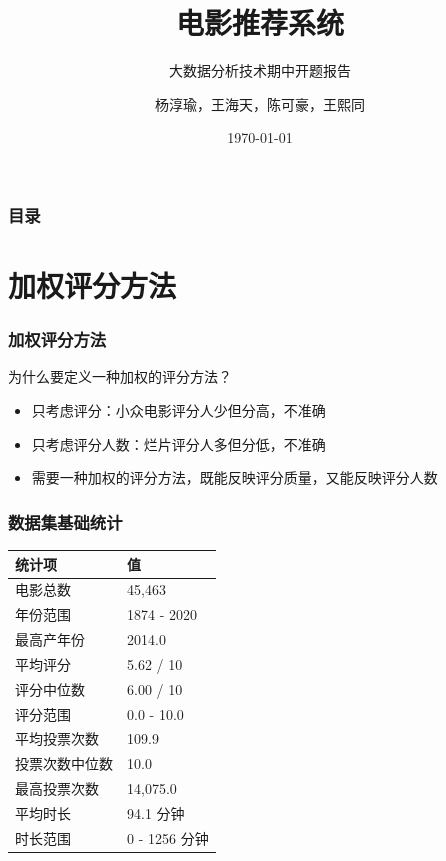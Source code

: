 \documentclass{beamer}
\title{电影推荐系统}
\subtitle{大数据分析技术期中开题报告}
\author{杨淳瑜，王海天，陈可豪，王熙同}
\date{\today}
\begin{document}
\begin{frame}
    \titlepage
\end{frame}

\begin{frame}
    \frametitle{目录}
    \tableofcontents
\end{frame}

\section{加权评分方法}

\begin{frame}
    \frametitle{加权评分方法}
    为什么要定义一种加权的评分方法？
    \begin{itemize}
        \item 只考虑评分：小众电影评分人少但分高，不准确
        \item 只考虑评分人数：烂片评分人多但分低，不准确
        \item 需要一种加权的评分方法，既能反映评分质量，又能反映评分人数
    \end{itemize}
\end{frame}

\begin{frame}
    \frametitle{数据集基础统计}
    \begin{table}
        \centering
        \begin{tabular}{ll}
            \toprule
            统计项     & 值           \\
            \midrule
            电影总数    & 45,463      \\
            年份范围    & 1874 - 2020 \\
            最高产年份   & 2014.0      \\
            平均评分    & 5.62 / 10   \\
            评分中位数   & 6.00 / 10   \\
            评分范围    & 0.0 - 10.0  \\
            平均投票次数  & 109.9       \\
            投票次数中位数 & 10.0        \\
            最高投票次数  & 14,075.0    \\
            平均时长    & 94.1 分钟     \\
            时长范围    & 0 - 1256 分钟 \\
            \bottomrule
        \end{tabular}
    \end{table}
\end{frame}
\end{document}
